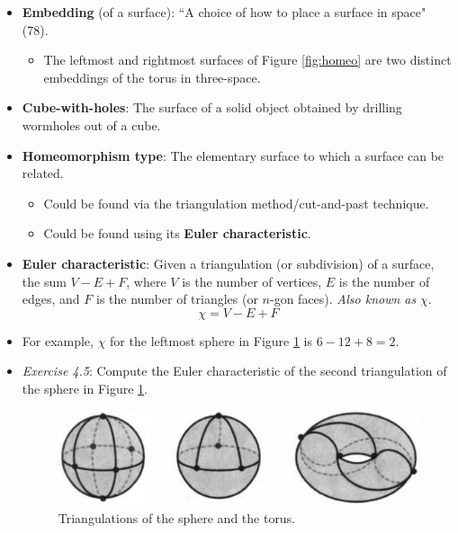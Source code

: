 \documentclass[titlepage]{article}
\numberwithin{figure}{section}
\numberwithin{table}{section}
\numberwithin{equation}{section}
\newcommand{\dq}[2]{``#1" (#2).}
\begin{document}
\begin{itemize}
    \begin{itemize}
        \item The sphere has genus 0 while the torus has genus 1.
    \end{itemize}
    \item \textbf{Embedding} (of a surface): \dq{A choice of how to place a surface in space}{78}
    \begin{itemize}
        \item The leftmost and rightmost surfaces of Figure \ref{fig:homeo} are two distinct embeddings of the torus in three-space.
    \end{itemize}
    \item \textbf{Cube-with-holes}: The surface of a solid object obtained by drilling wormholes out of a cube.
    \item \textbf{Homeomorphism type}: The elementary surface to which a surface can be related.
    \begin{itemize}
        \item Could be found via the triangulation method/cut-and-past technique.
        \item Could be found using its \textbf{Euler characteristic}.
    \end{itemize}
    \item \textbf{Euler characteristic}: Given a triangulation (or subdivision) of a surface, the sum $V-E+F$, where $V$ is the number of vertices, $E$ is the number of edges, and $F$ is the number of triangles (or $n$-gon faces). \emph{Also known as} $\chi$.
    \begin{equation}\label{eqn:eulerchar}
        \chi=V-E+F
    \end{equation}
    \item For example, $\chi$ for the leftmost sphere in Figure \ref{fig:triangulations} is $6-12+8=2$.
    \item \emph{Exercise 4.5}: Compute the Euler characteristic of the second triangulation of the sphere in Figure \ref{fig:triangulations}.
    \begin{figure}[h!]
        \centering
        \includegraphics[width=0.6\linewidth]{Blender/ex4-5.png}
        \caption{Triangulations of the sphere and the torus.}
        \label{fig:triangulations}
    \end{figure}

\end{itemize}
\end{document}
